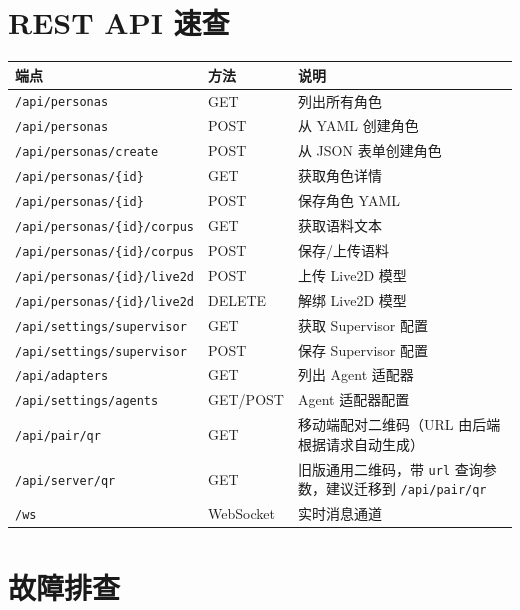\documentclass[12pt,a4paper]{article}
\begin{document}
\section{REST API 速查}

\begin{longtable}{p{5.5cm}p{2.5cm}p{5.5cm}}
\toprule
\textbf{端点} & \textbf{方法} & \textbf{说明} \\
\midrule
\endhead
\texttt{/api/personas} & GET & 列出所有角色 \\
\texttt{/api/personas} & POST & 从 YAML 创建角色 \\
\texttt{/api/personas/create} & POST & 从 JSON 表单创建角色 \\
\texttt{/api/personas/\{id\}} & GET & 获取角色详情 \\
\texttt{/api/personas/\{id\}} & POST & 保存角色 YAML \\
\texttt{/api/personas/\{id\}/corpus} & GET & 获取语料文本 \\
\texttt{/api/personas/\{id\}/corpus} & POST & 保存/上传语料 \\
\texttt{/api/personas/\{id\}/live2d} & POST & 上传 Live2D 模型 \\
\texttt{/api/personas/\{id\}/live2d} & DELETE & 解绑 Live2D 模型 \\
\texttt{/api/settings/supervisor} & GET & 获取 Supervisor 配置 \\
\texttt{/api/settings/supervisor} & POST & 保存 Supervisor 配置 \\
\texttt{/api/adapters} & GET & 列出 Agent 适配器 \\
\texttt{/api/settings/agents} & GET/POST & Agent 适配器配置 \\
\texttt{/api/pair/qr} & GET & 移动端配对二维码（URL 由后端根据请求自动生成） \\
\texttt{/api/server/qr} & GET & 旧版通用二维码，带 \texttt{url} 查询参数，建议迁移到 \texttt{/api/pair/qr} \\
\texttt{/ws} & WebSocket & 实时消息通道 \\
\bottomrule
\end{longtable}

\section{故障排查}
\end{document}

